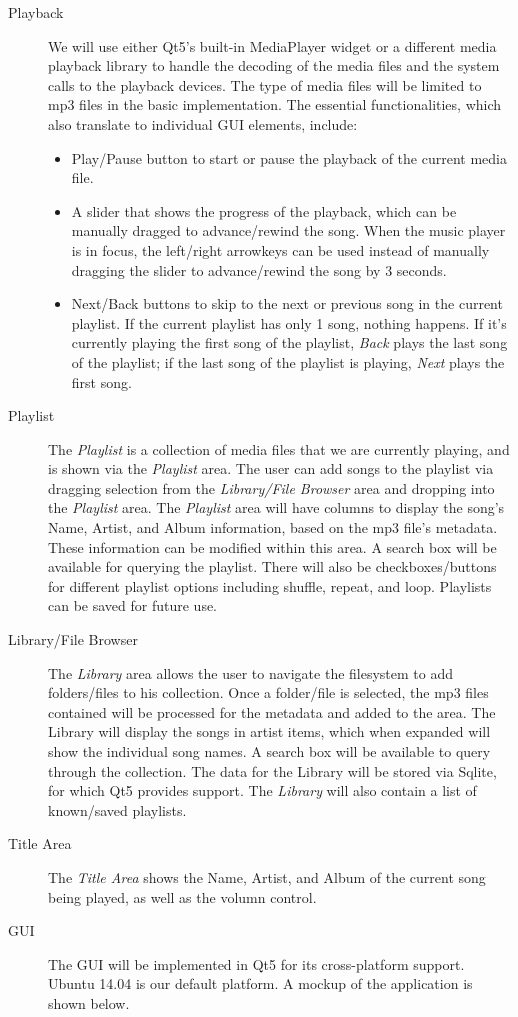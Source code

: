 \documentclass[12pt]{article}
\begin{document}
\begin{description}
    \item[Playback] We will use either Qt5's built-in MediaPlayer widget or a different media playback library to handle the decoding of the media files and the system calls to the playback devices. The type of media files will be limited to mp3 files in the basic implementation. The essential functionalities, which also translate to individual GUI elements, include:
        \begin{itemize}
            \item Play/Pause button to start or pause the playback of the current media file.
            \item A slider that shows the progress of the playback, which can be manually dragged to advance/rewind the song. When the music player is in focus, the left/right arrowkeys can be used instead of manually dragging the slider to advance/rewind the song by 3 seconds.
            \item Next/Back buttons to skip to the next or previous song in the current playlist. If the current playlist has only 1 song, nothing happens. If it's currently playing the first song of the playlist, \emph{Back} plays the last song of the playlist; if the last song of the playlist is playing, \emph{Next} plays the first song.
        \end{itemize}
    \item[Playlist] The \emph{Playlist} is a collection of media files that we are currently playing, and is shown via the \emph{Playlist} area. The user can add songs to the playlist via dragging selection from the \emph{Library/File Browser} area and dropping into the \emph{Playlist} area. The \emph{Playlist} area will have columns to display the song's Name, Artist, and Album information, based on the mp3 file's metadata. These information can be modified within this area. A search box will be available for querying the playlist. There will also be  checkboxes/buttons for different playlist options including shuffle, repeat, and loop. Playlists can be saved for future use.
    \item[Library/File Browser] The \emph{Library} area allows the user to navigate the filesystem to add folders/files to his collection. Once a folder/file is selected, the mp3 files contained will be processed for the metadata and added to the area. The Library will display the songs in artist items, which when expanded will show the individual song names. A search box will be available to query through the collection. The data for the Library will be stored via Sqlite, for which Qt5 provides support. The \emph{Library} will also contain a list of known/saved playlists.
    \item[Title Area] The \emph{Title Area} shows the Name, Artist, and Album of the current song being played, as well as the volumn control.
    \item[GUI] The GUI will be implemented in Qt5 for its cross-platform support. Ubuntu 14.04 is our default platform. A mockup of the application is shown below.
\end{description}
\end{document}
